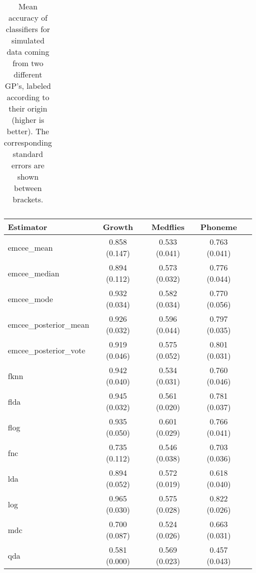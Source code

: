 \begin{table}[p]
\begin{tabular}{lcccc}
\bottomrule
\end{tabular}
  \caption{Mean accuracy of classifiers for simulated data coming from two different GP's, labeled according to their origin (higher is better). The corresponding standard errors are shown between brackets.}
\end{table}

\newpage

\begin{table}[p]
  \centering
  \begin{tabular}{lcccc}
\toprule
            \textbf{Estimator} &            \textbf{Growth} &           \textbf{Medflies} &           \textbf{Phoneme} \\
\midrule

          emcee\_mean & 0.858 (0.147) & 0.533 (0.041) & 0.763 (0.041) \\
        emcee\_median & 0.894 (0.112) & 0.573 (0.032) & 0.776 (0.044) \\
          emcee\_mode & 0.932 (0.034) & 0.582 (0.034) & 0.770 (0.056) \\
emcee\_posterior\_mean & 0.926 (0.032) & 0.596 (0.044) & 0.797 (0.035) \\
emcee\_posterior\_vote & 0.919 (0.046) & 0.575 (0.052) & 0.801 (0.031) \\
                fknn & 0.942 (0.040) & 0.534 (0.031) & 0.760 (0.046) \\
                flda & 0.945 (0.032) & 0.561 (0.020) & 0.781 (0.037) \\
                flog & 0.935 (0.050) & 0.601 (0.029) & 0.766 (0.041) \\
                 fnc & 0.735 (0.112) & 0.546 (0.038) & 0.703 (0.036) \\
                 lda & 0.894 (0.052) & 0.572 (0.019) & 0.618 (0.040) \\
                 log & 0.965 (0.030) & 0.575 (0.028) & 0.822 (0.026) \\
                 mdc & 0.700 (0.087) & 0.524 (0.026) & 0.663 (0.031) \\
                 qda & 0.581 (0.000) & 0.569 (0.023) & 0.457 (0.043) \\

\bottomrule
\toprule


\end{tabular}
\end{table}
